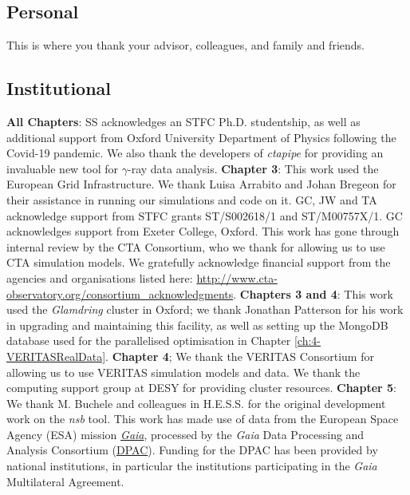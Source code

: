 \subsection*{Personal}

This is where you thank your advisor, colleagues, and family and friends.

\subsection*{Institutional}
\textbf{All Chapters}: SS acknowledges an STFC Ph.D. studentship, as well as additional support from Oxford University Department of Physics following the Covid-19 pandemic. We also thank the developers of \textit{ctapipe} for providing an invaluable new tool for $\gamma$-ray data analysis. \newline
\textbf{Chapter 3}: This work used the European Grid Infrastructure. We thank Luisa Arrabito and Johan Bregeon for their assistance in running our simulations and code on it. GC, JW and TA acknowledge support from STFC grants ST/S002618/1 and ST/M00757X/1. GC acknowledges support from Exeter College, Oxford. This work has gone through internal review by the CTA Consortium, who we thank for allowing us to use CTA simulation models. We gratefully acknowledge financial support from the agencies and organisations listed here: \url{http://www.cta-observatory.org/consortium\_acknowledgments}. \newline
\textbf{Chapters 3 and 4}: This work used the \textit{Glamdring} cluster in Oxford; we thank Jonathan Patterson for his work in upgrading and maintaining this facility, as well as setting up the MongoDB database used for the parallelised optimisation in Chapter \ref{ch:4-VERITASRealData}. \newline
\textbf{Chapter 4}; We thank the VERITAS Consortium for allowing us to use VERITAS simulation models and data. We thank the computing support group at DESY for providing cluster resources. \newline
\textbf{Chapter 5}: We thank M. Buchele and colleagues in H.E.S.S. for the original development work on the \textit{nsb} tool. This work has made use of data from the European Space Agency (ESA) mission \href{https://www.cosmos.esa.int/gaia}{\textit{Gaia}}, processed by the \textit{Gaia} Data Processing and Analysis Consortium (\href{https://www.cosmos.esa.int/web/gaia/dpac/consortium}{DPAC}). Funding for the DPAC has been provided by national institutions, in particular the institutions participating in the \textit{Gaia} Multilateral Agreement.